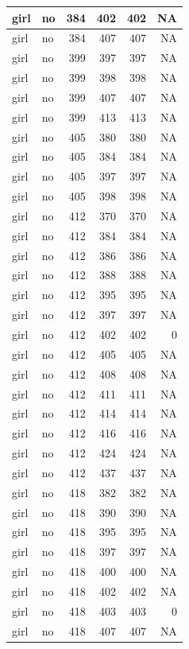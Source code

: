 \documentclass[man]{apa6}
\begin{document}
\begin{tabular}{l|l|r|r|r|r}
\hline
girl & no & 384 & 402 & 402 & NA\\
\hline
girl & no & 384 & 407 & 407 & NA\\
\hline
girl & no & 399 & 397 & 397 & NA\\
\hline
girl & no & 399 & 398 & 398 & NA\\
\hline
girl & no & 399 & 407 & 407 & NA\\
\hline
girl & no & 399 & 413 & 413 & NA\\
\hline
girl & no & 405 & 380 & 380 & NA\\
\hline
girl & no & 405 & 384 & 384 & NA\\
\hline
girl & no & 405 & 397 & 397 & NA\\
\hline
girl & no & 405 & 398 & 398 & NA\\
\hline
girl & no & 412 & 370 & 370 & NA\\
\hline
girl & no & 412 & 384 & 384 & NA\\
\hline
girl & no & 412 & 386 & 386 & NA\\
\hline
girl & no & 412 & 388 & 388 & NA\\
\hline
girl & no & 412 & 395 & 395 & NA\\
\hline
girl & no & 412 & 397 & 397 & NA\\
\hline
girl & no & 412 & 402 & 402 & 0\\
\hline
girl & no & 412 & 405 & 405 & NA\\
\hline
girl & no & 412 & 408 & 408 & NA\\
\hline
girl & no & 412 & 411 & 411 & NA\\
\hline
girl & no & 412 & 414 & 414 & NA\\
\hline
girl & no & 412 & 416 & 416 & NA\\
\hline
girl & no & 412 & 424 & 424 & NA\\
\hline
girl & no & 412 & 437 & 437 & NA\\
\hline
girl & no & 418 & 382 & 382 & NA\\
\hline
girl & no & 418 & 390 & 390 & NA\\
\hline
girl & no & 418 & 395 & 395 & NA\\
\hline
girl & no & 418 & 397 & 397 & NA\\
\hline
girl & no & 418 & 400 & 400 & NA\\
\hline
girl & no & 418 & 402 & 402 & NA\\
\hline
girl & no & 418 & 403 & 403 & 0\\
\hline
girl & no & 418 & 407 & 407 & NA\\

\end{tabular}
\end{document}
